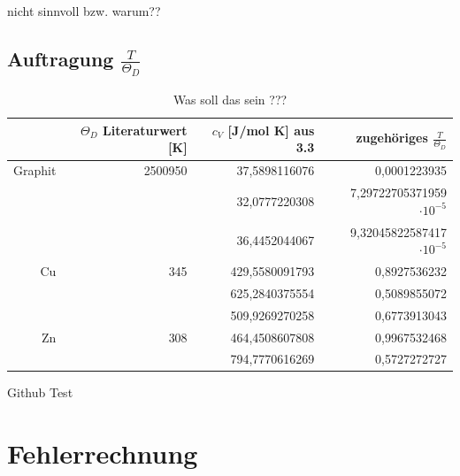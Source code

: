 \documentclass[12pt,a4paper,titlepage,headinclude,bibtotoc]{scrartcl}
\begin{document}
nicht sinnvoll bzw. warum??

\subsection{Auftragung $\frac{T}{\Theta_D}$}


\begin{table} [h!]
\centering
\caption{Was soll das sein ???}
\begin{tabular} {r | r |r | r }
&$\Theta_D$ Literaturwert [K] &$c_V$ [J/mol K] aus 3.3& zugehöriges $\frac{T}{\Theta_D}$ \\
\hline
Graphit& 2500950\protect\footnotemark &37,5898116076&0,0001223935 \\
&&32,0777220308& 7,29722705371959 $\cdot 10^{-5}$\\
&&36,4452044067& 9,32045822587417 $\cdot 10^{-5}$\\
Cu&345\protect\footnotemark &429,5580091793& 0,8927536232 \\
&&625,2840375554& 0,5089855072\\
&&509,9269270258& 0,6773913043\\
Zn&308\protect\footnotemark &464,4508607808& 0,9967532468\\
&&794,7770616269& 0,5727272727\\
\end{tabular}
\end{table}
\FloatBarrier


Github Test












\section{Fehlerrechnung}
\end{document}
